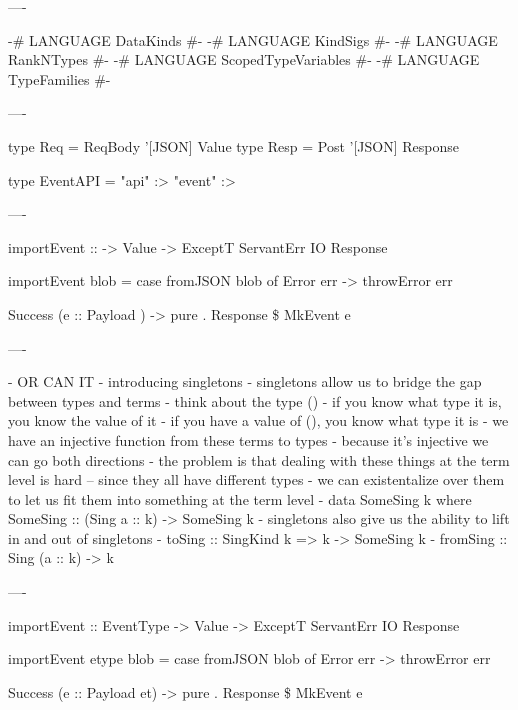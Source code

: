 ----

\begin{raw}
  {-# LANGUAGE DataKinds           #-}
  {-# LANGUAGE KindSigs            #-}
  {-# LANGUAGE RankNTypes          #-}
  {-# LANGUAGE ScopedTypeVariables #-}
  {-# LANGUAGE TypeFamilies        #-}
\end{raw}

----

\begin{raw}
  type Req  = ReqBody '[JSON] Value
  type Resp = Post    '[JSON] Response

  type EventAPI = "api" :> "event" :>
\end{raw}

----

\begin{raw}
  importEvent :: 
              -> Value
              -> ExceptT ServantErr IO Response

  importEvent  blob =
    case fromJSON blob of
      Error err ->
        throwError err

      Success (e :: Payload ) ->
        pure . Response \$ MkEvent e
\end{raw}

----

- OR CAN IT
  - introducing singletons
  - singletons allow us to bridge the gap between types and terms
  - think about the type ()
    - if you know what type it is, you know the value of it
    - if you have a value of (), you know what type it is
    - we have an injective function from these terms to types
      - because it's injective we can go both directions
  - the problem is that dealing with these things at the term level is hard -- since they all have different types
    - we can existentalize over them to let us fit them into something at the term level
    - data SomeSing k where SomeSing :: (Sing a :: k) -> SomeSing k
  - singletons also give us the ability to lift in and out of singletons
    - toSing :: SingKind k => k -> SomeSing k
    - fromSing :: Sing (a :: k) -> k

----

\begin{raw}
  importEvent :: EventType
              -> Value
              -> ExceptT ServantErr IO Response

  importEvent etype blob =
      case fromJSON blob of
        Error err ->
          throwError err

        Success (e :: Payload et) ->
          pure . Response \$ MkEvent e
\end{raw}

